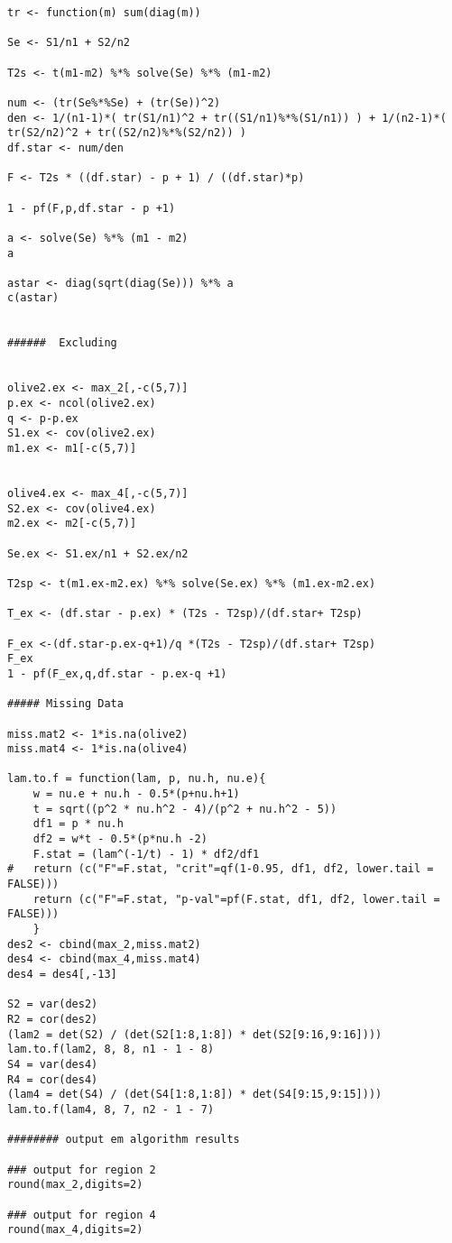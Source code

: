 \documentclass[11pt]{article}
\begin{document}
\begin{verbatim}
tr <- function(m) sum(diag(m))

Se <- S1/n1 + S2/n2

T2s <- t(m1-m2) %*% solve(Se) %*% (m1-m2)

num <- (tr(Se%*%Se) + (tr(Se))^2)
den <- 1/(n1-1)*( tr(S1/n1)^2 + tr((S1/n1)%*%(S1/n1)) ) + 1/(n2-1)*( tr(S2/n2)^2 + tr((S2/n2)%*%(S2/n2)) )
df.star <- num/den

F <- T2s * ((df.star) - p + 1) / ((df.star)*p)

1 - pf(F,p,df.star - p +1)

a <- solve(Se) %*% (m1 - m2)
a

astar <- diag(sqrt(diag(Se))) %*% a
c(astar) 


######  Excluding


olive2.ex <- max_2[,-c(5,7)]
p.ex <- ncol(olive2.ex)
q <- p-p.ex
S1.ex <- cov(olive2.ex)
m1.ex <- m1[-c(5,7)]


olive4.ex <- max_4[,-c(5,7)]
S2.ex <- cov(olive4.ex)
m2.ex <- m2[-c(5,7)]

Se.ex <- S1.ex/n1 + S2.ex/n2

T2sp <- t(m1.ex-m2.ex) %*% solve(Se.ex) %*% (m1.ex-m2.ex)

T_ex <- (df.star - p.ex) * (T2s - T2sp)/(df.star+ T2sp)

F_ex <-(df.star-p.ex-q+1)/q *(T2s - T2sp)/(df.star+ T2sp)
F_ex
1 - pf(F_ex,q,df.star - p.ex-q +1)

##### Missing Data

miss.mat2 <- 1*is.na(olive2)
miss.mat4 <- 1*is.na(olive4)

lam.to.f = function(lam, p, nu.h, nu.e){
    w = nu.e + nu.h - 0.5*(p+nu.h+1)
    t = sqrt((p^2 * nu.h^2 - 4)/(p^2 + nu.h^2 - 5))
    df1 = p * nu.h
    df2 = w*t - 0.5*(p*nu.h -2)
    F.stat = (lam^(-1/t) - 1) * df2/df1
#   return (c("F"=F.stat, "crit"=qf(1-0.95, df1, df2, lower.tail = FALSE)))
    return (c("F"=F.stat, "p-val"=pf(F.stat, df1, df2, lower.tail = FALSE)))
    }
des2 <- cbind(max_2,miss.mat2)
des4 <- cbind(max_4,miss.mat4)
des4 = des4[,-13]

S2 = var(des2)
R2 = cor(des2)
(lam2 = det(S2) / (det(S2[1:8,1:8]) * det(S2[9:16,9:16])))
lam.to.f(lam2, 8, 8, n1 - 1 - 8)
S4 = var(des4)
R4 = cor(des4)
(lam4 = det(S4) / (det(S4[1:8,1:8]) * det(S4[9:15,9:15])))
lam.to.f(lam4, 8, 7, n2 - 1 - 7)

######## output em algorithm results

### output for region 2
round(max_2,digits=2)

### output for region 4
round(max_4,digits=2)

\end{verbatim}
\endgroup
\end{document}
